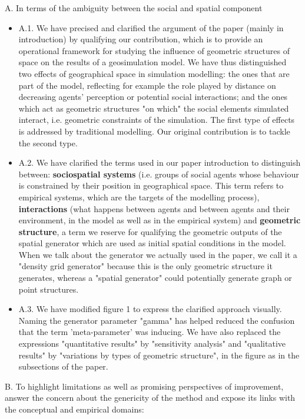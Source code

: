\documentclass[11pt,a4paper,sans]{moderncv}        %
\begin{document}
 \medskip
A. In terms of the ambiguity between the social and spatial component 
\begin{itemize}
\item A.1. We have precised and clarified the argument of the paper (mainly in introduction) by qualifying our contribution, which is to provide an operational framework for studying the influence of geometric structures of space on the results of a geosimulation model. We have thus distinguished two effects of geographical space in simulation modelling: the ones that are part of the model, reflecting for example the role played by distance on decreasing agents' perception or potential social interactions; and the ones which act as geometric structures "on which" the social elements simulated interact, i.e. geometric constraints of the simulation. The first type of effects is addressed by traditional modelling. Our original contribution is to tackle the second type. %
 
\item A.2. We have clarified the terms used in our paper introduction to distinguish between: \textbf{sociospatial systems} (i.e. groups of social agents whose behaviour is constrained by their position in geographical space. This term refers to empirical systems, which are the targets of the modelling process), \textbf{interactions} (what happens between agents and between agents and their environment, in the model as well as in the empirical system) and \textbf{geometric structure}, a term we reserve for qualifying the geometric outputs of the spatial generator which are used as initial spatial conditions in the model. When we talk about the generator we actually used in the paper, we call it a "density grid generator" because this is the only geometric structure it generates, whereas a "spatial generator" could potentially generate graph or point structures. %

 \item A.3. We have modified figure 1 to express the clarified approach visually. Naming the generator parameter "gamma" has helped reduced the confusion that the term 'meta-parameter' was inducing. We have also replaced the expressions "quantitative results" by "sensitivity analysis" and "qualitative results" by "variations by types of geometric structure", in the figure as in the subsections of the paper. %
\end{itemize}

 \medskip
B. To highlight limitations as well as promising perspectives of improvement, answer the concern about the genericity of the method and expose its links with the conceptual and empirical domains:
\end{document}
